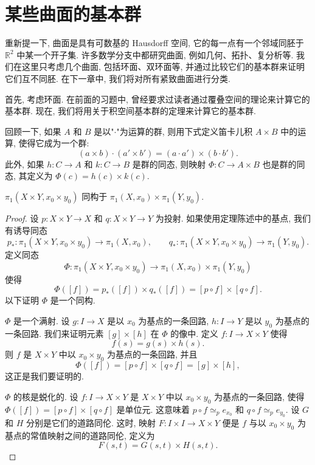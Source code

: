 \section{某些曲面的基本群}
\label{section:ch09-sec60}

重新提一下, 曲面是具有可数基的 Hausdorff 空间, 它的每一点有一个邻域同胚于 $\mathbb{R}^{2}$ 中某一个开子集. 许多数学分支中都研究曲面, 例如几何、拓扑、复分析等. 我们在这里只考虑几个曲面, 包括环面、双环面等, 并通过比较它们的基本群来证明它们互不同胚. 在下一章中, 我们将对所有紧致曲面进行分类.

首先, 考虑环面. 在前面的习题中, 曾经要求过读者通过覆叠空间的理论来计算它的基本群. 现在, 我们将用关于积空间基本群的定理来计算它的基本群.

回顾一下, 如果 $A$ 和 $B$ 是以"$\cdot$"为运算的群, 则用下式定义笛卡儿积 $A\times B$ 中的运算, 使得它成为一个群:
\[
(a\times b)\cdot(a'\times b')=(a\cdot a')\times(b\cdot b').
\]
此外, 如果 $h\colon C\to A$ 和 $k\colon C\to B$ 是群的同态, 则映射 $\Phi\colon C\to A\times B$ 也是群的同态, 其定义为 $\Phi(c)=h(c)\times k(c)$.

\begin{theorem}
\label{theorem:ch09-sec60-60-1}
$\pi_1(X\times Y,x_0\times y_0)$ 同构于 $\pi_1(X,x_0)\times\pi_1(Y,y_0)$.
\end{theorem}

\begin{proof}
设 $p\colon X\times Y\to X$ 和 $q\colon X\times Y\to Y$ 为投射. 如果使用定理陈述中的基点, 我们有诱导同态
\[
p_{*}\colon\pi_{1}(X\times Y,x_{0}\times y_{0})\longrightarrow\pi_{1}(X,x_{0}),\qquad
q_{*}\colon\pi_{1}(X\times Y,x_{0}\times y_{0})\longrightarrow\pi_{1}(Y,y_{0}).
\]
定义同态
\[
\Phi\colon\pi_{1}(X\times Y,x_{0}\times y_{0})\longrightarrow\pi_{1}(X,x_{0})\times\pi_{1}(Y,y_{0})
\]
使得
\[
\Phi([f])=p_{*}([f])\times q_{*}([f])=[p\circ f]\times[q\circ f].
\]
以下证明 $\Phi$ 是一个同构.

$\Phi$ 是一个满射. 设 $g\colon I\to X$ 是以 $x_0$ 为基点的一条回路, $h\colon I\to Y$ 是以 $y_0$ 为基点的一条回路. 我们来证明元素 $[g]\times[h]$ 在 $\Phi$ 的像中. 定义 $f\colon I\to X\times Y$ 使得
\[
f(s)=g(s)\times h(s).
\]
则 $f$ 是 $X\times Y$ 中以 $x_0\times y_0$ 为基点的一条回路, 并且
\[
\Phi([f])=[p\circ f]\times[q\circ f]=[g]\times[h],
\]
这正是我们要证明的.

$\Phi$ 的核是蜕化的. 设 $f\colon I\to X\times Y$ 是 $X\times Y$ 中以 $x_0\times y_0$ 为基点的一条回路, 使得 $\Phi([f])=[p\circ f]\times[q\circ f]$ 是单位元. 这意味着 $p\circ f\simeq_p e_{x_0}$ 和 $q\circ f\simeq_p e_{y_0}$. 设 $G$ 和 $H$ 分别是它们的道路同伦. 这时, 映射 $F\colon I\times I\to X\times Y$ 便是 $f$ 与以 $x_0\times y_0$ 为基点的常值映射之间的道路同伦, 定义为
\[
F(s,t)=G(s,t)\times H(s,t).
\]
\end{proof}

